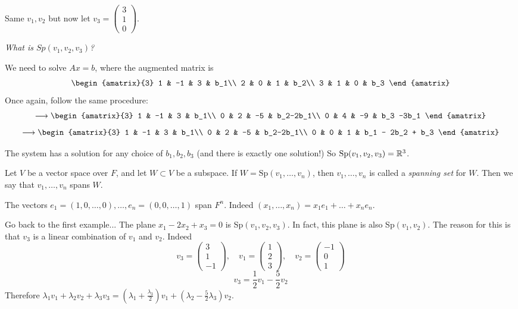 \documentclass[10pt]{scrartcl}
\begin{document}
\begin{example}
Same $v_1,v_2$ but now let $v_3 = \begin{pmatrix}
 3 \\ 1\\ 0	
 \end{pmatrix}$. 
 
 \emph{What is $Sp(v_1,v_2,v_3)$?}
 
 We need to solve $Ax = b$, where the augmented matrix is 
 \[
\begin{amatrix}{3}
  1 & -1 & 	3 & b_1\\
  2 & 0 & 1 & b_2\\
  3 & 1  & 0 & b_3
  \end{amatrix}
\]
Once again, follow the same procedure: 
 \[\longrightarrow 
\begin{amatrix}{3}
  1 & -1 & 	3 & b_1\\
  0 & 2 & -5 & b_2-2b_1\\
  0 & 4  & -9 & b_3 -3b_1
  \end{amatrix}
\]
 \[\longrightarrow 
\begin{amatrix}{3}
  1 & -1 & 	3 & b_1\\
  0 & 2 & -5 & b_2-2b_1\\
  0 & 0  & 1 & b_1 - 2b_2 + b_3
  \end{amatrix}
\]

The system has a solution for any choice of $b_1,b_2,b_3$ (and there is exactly one solution!) So $\mathrm{Sp}(v_1,v_2,v_3) = \mathbb{R}^3$. 	
\end{example}\vsp


\begin{definition}
Let $V$ be a vector space over $F$, and let $W \subset V$ be a subspace. If $W = \mathrm{Sp}(v_1,\dots,v_n)$, then $v_1,\dots,v_n$ is called a \emph{spanning set} for $W$. Then we say that $v_1,\dots,v_n$ spans $W$. 	
\end{definition}\vsp

\begin{example}
The vectors $e_1 = (1,0,\dots,0),\dots,e_n = (0,0,\dots,1)$ span $F^n$. Indeed $(x_1,\dots,x_n) =  x_1e_1 + \dots + x_ne_n$. 

Go back to the first example... The plane $x_1 - 2x_2 + x_3 = 0$ is Sp$(v_1,v_2,v_3)$. In fact, this plane is also Sp$(v_1,v_2)$. The reason for this is that $v_3$ is a linear combination of $v_1$ and $v_2$. Indeed 
\[
  v_3 = \begin{pmatrix}
 3 \\ 1 \\ -1	
 \end{pmatrix},\quad 
 v_1 = \begin{pmatrix}
 1 \\ 2\\ 3	
 \end{pmatrix},\quad 
 v_2 = \begin{pmatrix}
 -1 \\ 0 \\ 1	
 \end{pmatrix}
\]
\[
  v_3 = \frac{1}{2}v_1 - \frac{5}{2}v_2
\]
Therefore $\lambda_1v_1 +\lambda_2v_2 + \lambda_3v_3 = (\lambda_1 + \frac{\lambda_3}{2})v_1 + (\lambda_2 - \frac{5}{2}\lambda_3)v_2$. 
\end{example}
\end{document}
